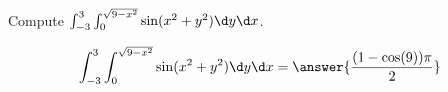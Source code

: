 \documentclass{ximera}
\author{David Guichard \and Neal Koblitz \and H. Jerome Keisler \and Albert Scheller \and Barry Balof \and Mike Wills \and Matthew Carr}
\begin{document}
\begin{exercise}





Compute $\int_{-3}^{3}\int_{0}^{\sqrt{9-x^2}}\sin(x^2+y^2)\d y\d x$.
\begin{prompt}
\[
\int_{-3}^{3}\int_{0}^{\sqrt{9-x^2}}\sin(x^2+y^2)\d y\d x=\answer{\frac{(1-\cos(9))\pi}{2}}
\]
\end{prompt}



\end{exercise}
\end{document}
